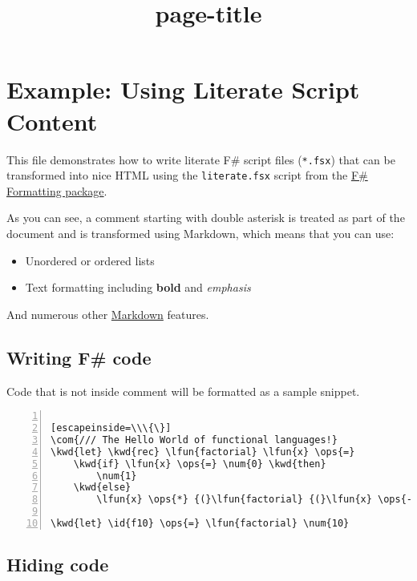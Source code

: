 \documentclass{article}
\title{{page-title}}
\date{}
\newcommand{\id}[1]{\textcolor{black}{#1}}
\newcommand{\com}[1]{\textcolor{officegreen}{#1}}
\newcommand{\kwd}[1]{\textcolor{navy}{#1}}
\newcommand{\num}[1]{\textcolor{officegreen}{#1}}
\newcommand{\ops}[1]{\textcolor{purple}{#1}}
\begin{document}
\maketitle


\section*{Example: Using Literate Script Content}



This file demonstrates how to write literate F\# script
files (\texttt{*.fsx}) that can be transformed into nice HTML
using the \texttt{literate.fsx} script from the \href{http://fsprojects.github.io/FSharp.Formatting}{F\# Formatting
package}.


As you can see, a comment starting with double asterisk
is treated as part of the document and is transformed
using Markdown, which means that you can use:
\begin{itemize}
\item Unordered or ordered lists

\item Text formatting including \textbf{bold} and \emph{emphasis}

\end{itemize}



And numerous other \href{http://daringfireball.net/projects/markdown}{Markdown} features.
\subsection*{Writing F\# code}



Code that is not inside comment will be formatted as
a sample snippet.
\begin{lstlisting}[numbers=left]

[escapeinside=\\\{\}]
\com{/// The Hello World of functional languages!}
\kwd{let} \kwd{rec} \lfun{factorial} \lfun{x} \ops{=}
    \kwd{if} \lfun{x} \ops{=} \num{0} \kwd{then}
        \num{1}
    \kwd{else}
        \lfun{x} \ops{*} {(}\lfun{factorial} {(}\lfun{x} \ops{-} \num{1}{)}{)}

\kwd{let} \id{f10} \ops{=} \lfun{factorial} \num{10}

\end{lstlisting}

\subsection*{Hiding code}
\end{document}
